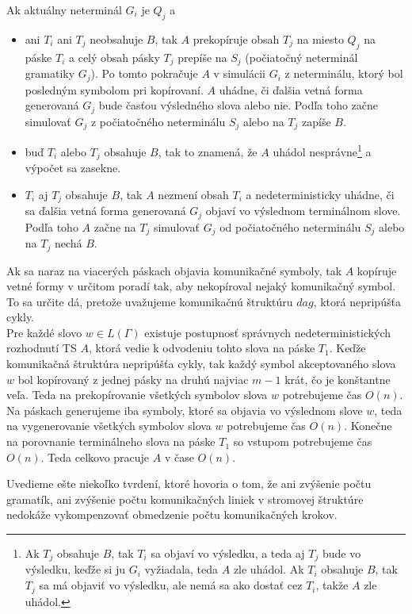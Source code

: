 \begin{dokaz}
Ak aktuálny neterminál $G_i$ je $Q_j$ a
\begin{itemize}
  \item ani $T_i$ ani $T_j$ neobsahuje $B$, tak $A$ prekopíruje obsah
  $T_j$ na miesto $Q_j$ na páske $T_i$ a celý obsah pásky $T_j$
  prepíše na $S_j$ (počiatočný neterminál gramatiky $G_j$). Po tomto
  pokračuje $A$ v simulácii $G_i$ z neterminálu, ktorý bol posledným
  symbolom pri kopírovaní. $A$ uhádne, či ďalšia vetná forma
  generovaná $G_j$ bude časťou výsledného slova alebo nie. Podľa
  toho začne simulovať $G_j$ z počiatočného neterminálu $S_j$ alebo
  na $T_j$ zapíše $B$.
  \item buď $T_i$ alebo $T_j$
  obsahuje $B$, tak to znamená, že $A$ uhádol nesprávne\footnote{Ak
  $T_j$ obsahuje $B$, tak $T_i$ sa objaví vo výsledku, a teda aj
  $T_j$ bude vo výsledku, keďže si ju $G_i$ vyžiadala, teda $A$ zle
  uhádol. Ak $T_i$ obsahuje $B$, tak $T_j$ sa má objaviť vo
  výsledku, ale nemá sa ako dostať cez $T_i$, takže $A$ zle uhádol.} a
  výpočet sa zasekne.
  \item $T_i$ aj $T_j$ obsahuje $B$, tak $A$ nezmení obsah $T_i$ a
  nedeterministicky uhádne, či sa ďalšia vetná forma generovaná
  $G_j$ objaví vo výslednom terminálnom slove. Podľa toho $A$ začne na
  $T_j$ simulovať $G_j$ od počiatočného neterminálu $S_j$ alebo na
  $T_j$ nechá $B$.
\end{itemize}
Ak sa naraz na viacerých páskach objavia komunikačné symboly, tak
$A$ kopíruje vetné formy v určitom poradí tak, aby nekopíroval
nejaký komunikačný symbol. To sa určite dá, pretože uvažujeme
komunikačnú štruktúru $dag$, ktorá nepripúšťa cykly. \\ Pre každé
slovo $w\in L(\Gamma)$ existuje postupnosť správnych
nedeterministických rozhodnutí TS $A$, ktorá vedie k odvodeniu
tohto slova na páske $T_1$. Keďže komunikačná štruktúra nepripúšťa
cykly, tak každý symbol akceptovaného slova $w$ bol kopírovaný z
jednej pásky na druhú najviac $m-1$ krát, čo je konštantne veľa.
Teda na prekopírovanie všetkých symbolov slova $w$ potrebujeme čas
$O(n)$. Na páskach generujeme iba symboly, ktoré sa objavia vo
výslednom slove $w$, teda na vygenerovanie všetkých symbolov slova
$w$ potrebujeme čas $O(n)$. Konečne na porovnanie terminálneho
slova na páske $T_1$ so vstupom potrebujeme čas $O(n)$. Teda
celkovo pracuje $A$ v čase $O(n)$.
\end{dokaz}

\medskip

Uvedieme ešte niekoľko tvrdení, ktoré hovoria o tom, že ani
zvýšenie počtu gramatík, ani zvýšenie počtu komunikačných liniek v
stromovej štruktúre nedokáže vykompenzovať obmedzenie počtu
komunikačných krokov.

